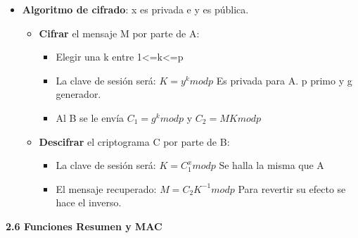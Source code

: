 \documentclass[12pt, twoside, openright]{report} %
\begin{document}
  \begin{itemize}
  \item \textbf{Algoritmo de cifrado}: x es privada e y es pública.
    

    \begin{itemize}
    \item \textbf{Cifrar} el mensaje M por parte de A:
      

      \begin{itemize}
      \item Elegir una k entre 1\textless=k\textless=p
        
      \item La clave de sesión será: $K=y^k mod p$ Es privada para A. p
        primo y g generador.
        
      \item Al B se le envía $C_1 = g^k mod p$ y $C_2 = M K mod p$
        
      \end{itemize}
    \item \textbf{Descifrar} el criptograma C por parte de B:
      

      \begin{itemize}
      \item La clave de sesión será: $K=C_1^x mod p$ Se halla la misma que A
        
      \item El mensaje recuperado: $M=C_2 K^{-1} mod p$ Para revertir su
        efecto se hace el inverso.
        
      \end{itemize}
    \end{itemize}
  \end{itemize}

  
  \textbf{2.6 Funciones Resumen y MAC}
  
\end{document}
